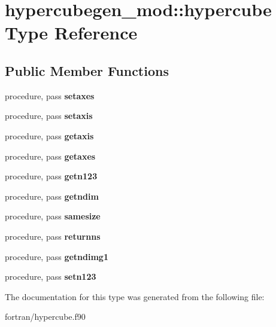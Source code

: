 \hypertarget{structhypercubegen__mod_1_1hypercube}{}\section{hypercubegen\+\_\+mod\+:\+:hypercube Type Reference}
\label{structhypercubegen__mod_1_1hypercube}
\subsection*{Public Member Functions}
\begin{DoxyCompactItemize}
\item 
\mbox{\label{structhypercubegen__mod_1_1hypercube_af8831cac19b9cb9448647601e6ab8937}} 
procedure, pass {\bfseries setaxes}
\item 
\mbox{\label{structhypercubegen__mod_1_1hypercube_a836759e320edfba1b5650d6da3330635}} 
procedure, pass {\bfseries setaxis}
\item 
\mbox{\label{structhypercubegen__mod_1_1hypercube_ab56dcbe307d4186ca4b306faa321491f}} 
procedure, pass {\bfseries getaxis}
\item 
\mbox{\label{structhypercubegen__mod_1_1hypercube_a1a814820a5b25a61833c4057bd0f163c}} 
procedure, pass {\bfseries getaxes}
\item 
\mbox{\label{structhypercubegen__mod_1_1hypercube_a557f29baf45e059450660389097428ec}} 
procedure, pass {\bfseries getn123}
\item 
\mbox{\label{structhypercubegen__mod_1_1hypercube_ad4acfd328c214509d29a8327913a8e47}} 
procedure, pass {\bfseries getndim}
\item 
\mbox{\label{structhypercubegen__mod_1_1hypercube_a686732450a05dac262d4291a2c0b5609}} 
procedure, pass {\bfseries samesize}
\item 
\mbox{\label{structhypercubegen__mod_1_1hypercube_a672883968b45c3b312a3d71c28872fc3}} 
procedure, pass {\bfseries returnns}
\item 
\mbox{\label{structhypercubegen__mod_1_1hypercube_a1d62a54f70cb2aeded1d11c1ad2f3a0a}} 
procedure, pass {\bfseries getndimg1}
\item 
\mbox{\label{structhypercubegen__mod_1_1hypercube_a0ebe5b4800280f4a46465685ed5e2267}} 
procedure, pass {\bfseries setn123}
\end{DoxyCompactItemize}


The documentation for this type was generated from the following file\+:\begin{DoxyCompactItemize}
\item 
fortran/hypercube.\+f90\end{DoxyCompactItemize}
